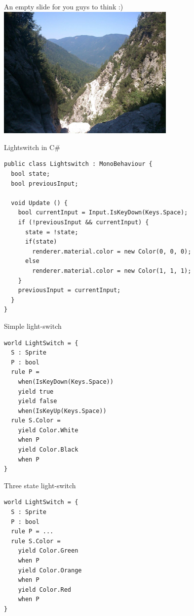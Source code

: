 \documentclass{beamer}
\begin{document}
\begin{frame}{An empty slide for you guys to think :)}
\center
\includegraphics[height=6.5cm]{Pics/mountains.png}
\end{frame}

\begin{frame}[fragile]{Lightswitch in C\#}
\begin{lstlisting}[frame=shadowbox]
public class Lightswitch : MonoBehaviour {
  bool state;
  bool previousInput;
	
  void Update () {
    bool currentInput = Input.IsKeyDown(Keys.Space);
    if (!previousInput && currentInput) {
      state = !state;
      if(state)
        renderer.material.color = new Color(0, 0, 0);
      else 
        renderer.material.color = new Color(1, 1, 1);
    }
    previousInput = currentInput;
  }
}
\end{lstlisting}
\end{frame}

\begin{frame}[fragile]{Simple light-switch}
\begin{lstlisting}[frame=shadowbox]
world LightSwitch = {
  S : Sprite
  P : bool
  rule P = 
    when(IsKeyDown(Keys.Space))
    yield true
    yield false
    when(IsKeyUp(Keys.Space))
  rule S.Color = 
    yield Color.White
    when P
    yield Color.Black
    when P
}
\end{lstlisting}
\end{frame}

\begin{frame}[fragile]{Three state light-switch}
\begin{lstlisting}[frame=shadowbox]
world LightSwitch = {
  S : Sprite
  P : bool
  rule P = ...
  rule S.Color = 
    yield Color.Green
    when P
    yield Color.Orange
    when P
    yield Color.Red
    when P
}
\end{lstlisting}
\end{frame}
\end{document}
